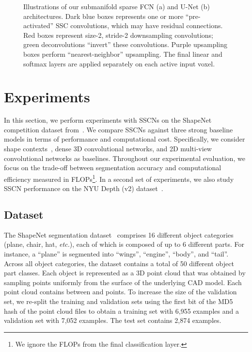 \documentclass[10pt,twocolumn,letterpaper]{article}
\begin{document}
\begin{figure*}[t]
    \centering
    \qquad
    \qquad
    \caption{Illustrations of our submanifold sparse FCN (a) and U-Net (b) architectures. Dark blue boxes represents one or more ``pre-activated'' SSC convolutions, which may have residual connections. Red boxes represent size-2, stride-2 downsampling convolutions; green deconvolutions ``invert'' these convolutions. Purple upsampling boxes perform ``nearest-neighbor'' upsampling. The final linear and softmax layers are applied separately on each active input voxel.
    }
    \label{fig:architecture_diagram}
\end{figure*}
 \section{Experiments}
In this section, we perform experiments with SSCNs on the ShapeNet competition dataset from~\cite{yi2017large}. We compare SSCNs against three strong baseline models in terms of performance and computational cost. Specifically, we consider shape contexts~\cite{belongie2002shape}, dense 3D convolutional networks, and 2D multi-view convolutional networks \cite{conf/iccv/SuMKL15} as baselines. Throughout our experimental evaluation, we focus on the trade-off between segmentation accuracy and computational efficiency measured in FLOPs\footnote{We ignore the FLOPs from the final classification layer.}. In a second set of experiments, we also study SSCN performance on the NYU Depth (v2) dataset~\cite{silberman2012indoor}.


\subsection{Dataset}
The ShapeNet segmentation dataset~\cite{yi2017large} comprises 16 different object categories (plane, chair, hat, \emph{etc.}), each of which is composed of up to 6 different parts. For instance, a ``plane'' is segmented into ``wings'', ``engine'', ``body'', and ``tail''.
Across all object categories, the dataset contains a total of 50 different object part classes. Each object is represented as a 3D point cloud that was obtained by sampling points uniformly from the surface of the underlying CAD model. Each point cloud contains between  and  points. To increase the size of the validation set, we re-split the training and validation sets using the first bit of the MD5 hash of the point cloud files to obtain a training set with 6,955 examples and a validation set with 7,052 examples. The test set contains 2,874 examples.
\end{document}
